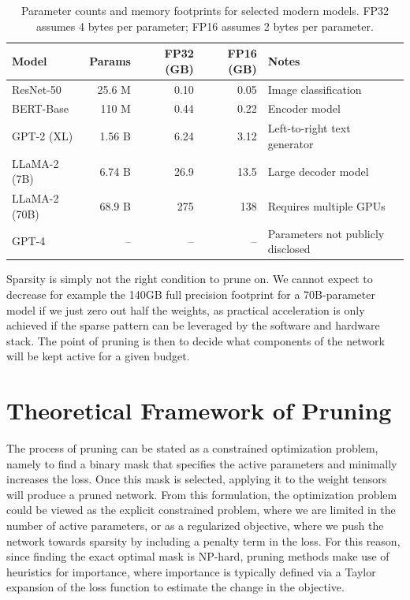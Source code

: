 \begin{table}[H]
	\centering
	\caption{Parameter counts and memory footprints for selected modern models.
		FP32 assumes 4 bytes per parameter; FP16 assumes 2 bytes per parameter.}
	\label{tab:model_sizes}
	\small
	\renewcommand{\arraystretch}{1.3}
	\begin{tabularx}{\textwidth}{lrrrX}
		\toprule
		\textbf{Model} & \textbf{Params} & \textbf{FP32 (GB)} & \textbf{FP16 (GB)}
		& \textbf{Notes} \\
		\midrule
		ResNet-50          & 25.6 M  & 0.10 & 0.05 & Image classification \\
		BERT-Base          & 110 M   & 0.44 & 0.22 & Encoder model \\
		GPT-2 (XL)        & 1.56 B  & 6.24 & 3.12 & Left-to-right text generator \\
		LLaMA-2 (7B)      & 6.74 B  & 26.9 & 13.5 & Large decoder model \\
		LLaMA-2 (70B)     & 68.9 B  & 275  & 138  & Requires multiple GPUs \\
		GPT-4             & --       & --   & --   & Parameters not publicly disclosed \\
		\bottomrule
	\end{tabularx}
\end{table}

Sparsity is simply not the right condition to prune on. We cannot expect to decrease for example the 140GB full precision footprint for a 70B-parameter model if we just zero out half the weights, as practical acceleration is only achieved if the sparse pattern can be leveraged by the software and hardware stack\cite{gale2020sparsegpu,cheng2024survey}. The point of pruning is then to decide what components of the network will be kept active for a given budget.

\section{Theoretical Framework of Pruning}
\label{sec:pruning_theoretical_framework}
The process of pruning can be stated as a constrained optimization problem, namely to find a binary mask that specifies the active parameters and minimally increases the loss. Once this mask is selected, applying it to the weight tensors will produce a pruned network. From this formulation, the optimization problem could be viewed as the explicit constrained problem, where we are limited in the number of active parameters, or as a regularized objective, where we push the network towards sparsity by including a penalty term in the loss. For this reason, since finding the exact optimal mask is NP-hard, pruning methods make use of heuristics for importance, where importance is typically defined via a Taylor expansion of the loss function to estimate the change in the objective.
